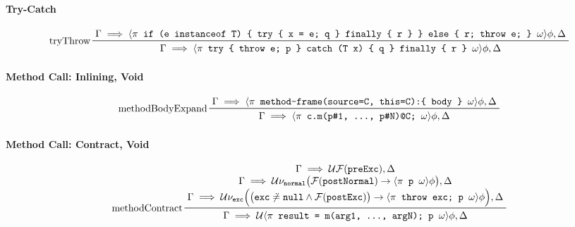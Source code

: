 \documentclass[a4paper, 11pt, accentcolor = tud3b]{tudreport}
\begin{document}
				\paragraph{Try-Catch} %
				{ \footnotesize \begin{equation*}
					\prftree[l]
						{tryThrow}
						{\Gamma \implies \langle \pi \texttt{ if (e instanceof T) \{ try \{ x = e; q \} finally \{ r \} \} else \{ r; throw e; \} } \omega \rangle \phi, \Delta}
						{\Gamma \implies \langle \pi \texttt{ try \{ throw e; p \} catch (T x) \{ q \} finally \{ r \} } \omega \rangle \phi, \Delta}
				\end{equation*} }
			
				\paragraph{Method Call: Inlining, Void} %
				\begin{equation*}
					\prftree[l]
						{methodBodyExpand}
						{\Gamma \implies \langle \pi \texttt{ method-frame(source=C, this=C):\{ body \} } \omega \rangle \phi, \Delta}
						{\Gamma \implies \langle \pi \texttt{ c.m(p\#1, ..., p\#N)@C; } \omega\rangle \phi, \Delta}
				\end{equation*}
				
				\paragraph{Method Call: Contract, Void} %
				\begin{equation*}
					\prftree[l]
						{methodContract}
						{\let\scriptstyle\textstyle \substack{
						 \Gamma \implies \mathcal{U} \mathcal{F}(\texttt{preExc}), \Delta \\
						 \Gamma \implies \mathcal{U} \nu_\texttt{normal} \big( \mathcal{F}(\texttt{postNormal}) \to \langle \pi \texttt{ p } \omega \rangle \phi \big), \Delta \\
						 \Gamma \implies \mathcal{U} \nu_\texttt{exc} \Big( \big( \texttt{exc} \not\doteq \texttt{null} \land \mathcal{F}(\texttt{postExc}) \big) \to \langle \pi \texttt{ throw exc; p } \omega \rangle \phi \Big), \Delta}}
						{\Gamma \implies \mathcal{U} \langle \pi \texttt{ result = m(arg1, ..., argN); p } \omega \rangle \phi, \Delta}
				\end{equation*}
			
\end{document}
